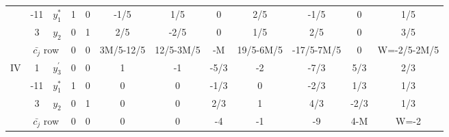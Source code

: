\documentclass[12pt]{article}
\begin{document}
\begin{table}[H]
\begin{tabular}{cccccccccccc}
    & -11   & $ y_1^{*}$ & 1     & 0     & \cellcolor[rgb]{ .588,  1,  .984}-1/5 & 1/5   & 0     & 2/5   & -1/5  & 0     & 1/5 \\
    & 3     & $y_2$ & 0     & 1     & \cellcolor[rgb]{ .588,  1,  .984}2/5 & -2/5  & 0     & 1/5   & 2/5   & 0     & 3/5 \\
\cmidrule{2-12}          & \multicolumn{2}{c}{$ \bar{c_j} $ row} & 0     & 0     & 3M/5-12/5 & 12/5-3M/5 & -M    & 19/5-6M/5 & -17/5-7M/5 & 0     & W=-2/5-2M/5 \\
\midrule
\multirow{4}[4]{*}{IV} & 1     & $y_3^{'}$ & 0     & 0     & 1     & -1    & -5/3  & -2    & -7/3  & 5/3   & 2/3 \\
    & -11   & $ y_1^{*}$ & 1     & 0     & 0     & 0     & -1/3  & 0     & -2/3  & 1/3   & 1/3 \\
    & 3     & $y_2$ & 0     & 1     & 0     & 0     & 2/3   & 1     & 4/3   & -2/3  & 1/3 \\
\cmidrule{2-12}          & \multicolumn{2}{c}{$ \bar{c_j} $ row} & 0     & 0     & 0     & 0     & -4    & -1    & -9    & 4-M   & W=-2 \\
\bottomrule
\end{tabular}%
\end{table}%
\end{document}
